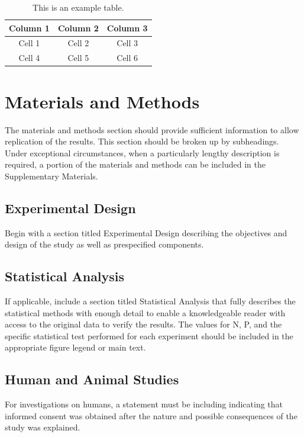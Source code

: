 \documentclass{article}
\begin{document}
\begin{table}[b]
    \caption{This is an example table.}    
    \centering
    \begin{tabular}{ccc}
            \hline
            Column 1 & Column 2 & Column 3 \\  
            \hline
            Cell 1 & Cell 2 & Cell 3\\ 
            Cell 4 & Cell 5 & Cell 6 \\
            \hline
            \end{tabular}

    \label{tab:1}
\end{table}

\section{Materials and Methods}
The materials and methods section should provide sufficient information to allow replication of the results. This section should be broken up by subheadings. Under exceptional circumstances, when a particularly lengthy description is required, a portion of the materials and methods can be included in the Supplementary Materials. 

\subsection{Experimental Design}
Begin with a section titled Experimental Design describing the objectives and design of the study as well as prespecified components. 

\subsection{Statistical Analysis}
If applicable, include a section titled Statistical Analysis that fully describes the statistical methods with enough detail to enable a knowledgeable reader with access to the original data to verify the results. The values for N, P, and the specific statistical test performed for each experiment should be included in the appropriate figure legend or main text. 

\subsection{Human and Animal Studies}
For investigations on humans, a statement must be including indicating that informed consent was obtained after the nature and possible consequences of the study was explained.
\end{document}
